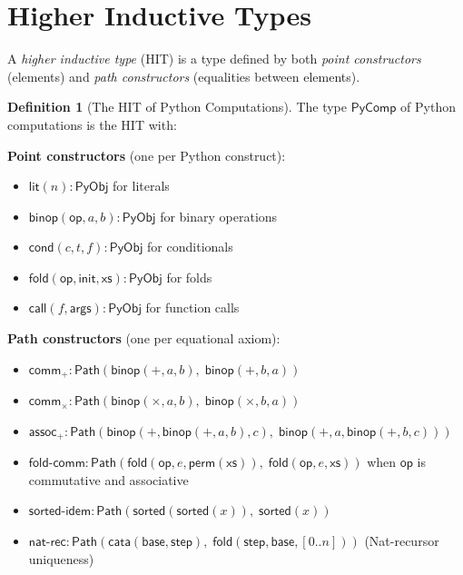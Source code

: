 \documentclass[11pt,a4paper]{report}
\theoremstyle{definition}
\newtheorem{definition}{Definition}[chapter]
\theoremstyle{plain}
\newcommand{\Path}{\mathsf{Path}}
\newcommand{\PyObj}{\mathsf{PyObj}}
\newcommand{\fold}{\mathsf{fold}}
\newcommand{\cata}{\mathsf{cata}}
\newcommand{\op}{\mathsf{op}}
\begin{document}
\section{Higher Inductive Types}

A \emph{higher inductive type} (HIT) is a type defined by both
\emph{point constructors} (elements) and \emph{path constructors}
(equalities between elements).

\begin{definition}[The HIT of Python Computations]
\label{def:pycomp-hit}
The type $\mathsf{PyComp}$ of Python computations is the HIT with:

\textbf{Point constructors} (one per Python construct):
\begin{itemize}
  \item $\mathsf{lit}(n) : \PyObj$ for literals
  \item $\mathsf{binop}(\op, a, b) : \PyObj$ for binary operations
  \item $\mathsf{cond}(c, t, f) : \PyObj$ for conditionals
  \item $\fold(\op, \mathsf{init}, \mathsf{xs}) : \PyObj$ for folds
  \item $\mathsf{call}(f, \mathsf{args}) : \PyObj$ for function calls
\end{itemize}

\textbf{Path constructors} (one per equational axiom):
\begin{itemize}
  \item $\mathsf{comm}_+ : \Path(\mathsf{binop}(+, a, b),\;
    \mathsf{binop}(+, b, a))$
  \item $\mathsf{comm}_\times : \Path(\mathsf{binop}(\times, a, b),\;
    \mathsf{binop}(\times, b, a))$
  \item $\mathsf{assoc}_+ : \Path(\mathsf{binop}(+,
    \mathsf{binop}(+, a, b), c),\;
    \mathsf{binop}(+, a, \mathsf{binop}(+, b, c)))$
  \item $\mathsf{fold\text{-}comm} : \Path(\fold(\op, e,
    \mathsf{perm}(\mathsf{xs})),\; \fold(\op, e, \mathsf{xs}))$
    when $\op$ is commutative and associative
  \item $\mathsf{sorted\text{-}idem} : \Path(\mathsf{sorted}(
    \mathsf{sorted}(x)),\; \mathsf{sorted}(x))$
  \item $\mathsf{nat\text{-}rec} : \Path(\cata(\mathsf{base},
    \mathsf{step}),\; \fold(\mathsf{step}, \mathsf{base},
    [0..n]))$ (Nat-recursor uniqueness)
\end{itemize}
\end{definition}
\end{document}
